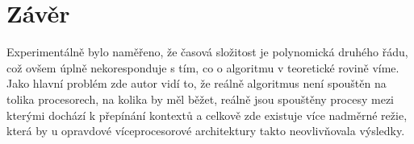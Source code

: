 \documentclass[a4paper,10pt]{article}
\begin{document}
	\section{Závěr}
	\label{sec:terminus}
	\par Experimentálně bylo naměřeno, že časová složitost je polynomická druhého řádu, což ovšem úplně nekoresponduje s tím, co o algoritmu v teoretické rovině víme. Jako hlavní problém zde autor vidí to, že reálně algoritmus není spouštěn na tolika procesorech, na kolika by měl běžet, reálně jsou spouštěny procesy mezi kterými dochází k přepínání kontextů a celkově zde existuje více nadměrné režie, která by u opravdové víceprocesorové architektury takto neovlivňovala výsledky.
\end{document}
